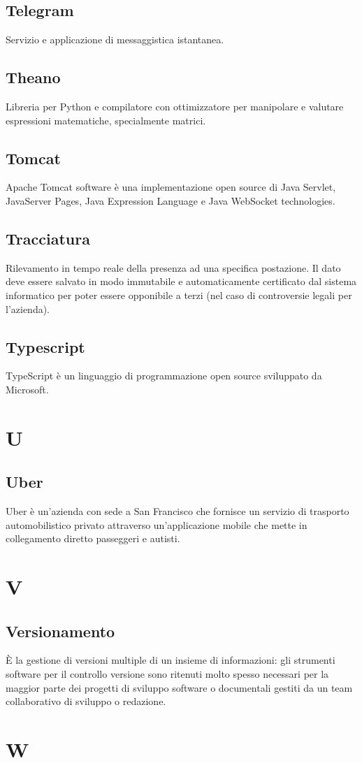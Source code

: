 \subsection{Telegram} Servizio e applicazione di messaggistica istantanea.
\subsection{Theano} Libreria per Python e compilatore con ottimizzatore per manipolare e valutare espressioni matematiche, specialmente matrici.
\subsection{Tomcat} Apache Tomcat software è una implementazione open source di Java Servlet, JavaServer Pages, Java Expression Language e Java WebSocket technologies.
\subsection{Tracciatura} Rilevamento in tempo reale della presenza ad una specifica
postazione. Il dato deve essere salvato in modo immutabile e automaticamente certificato dal
sistema informatico per poter essere opponibile a terzi (nel caso di controversie legali per l’azienda).
\subsection{Typescript} TypeScript è un linguaggio di programmazione open source sviluppato da Microsoft.
\newpage \section{U}
\subsection{Uber} Uber è un'azienda con sede a San Francisco che fornisce un servizio di trasporto automobilistico privato attraverso un'applicazione mobile che mette in collegamento diretto passeggeri e autisti.
\newpage \section{V}
\subsection{Versionamento} È la gestione di versioni multiple di un insieme di informazioni: gli strumenti software per il controllo versione sono ritenuti molto spesso necessari per la maggior parte dei progetti di sviluppo software o documentali gestiti da un team collaborativo di sviluppo o redazione.
\newpage \section{W}
